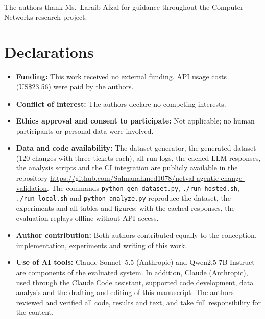 \documentclass[pdflatex,iicol,sn-mathphys-num]{sn-jnl}%
\theoremstyle{thmstyletwo}%
\begin{document}
\backmatter

The authors thank Ms.\ Laraib Afzal for guidance throughout the Computer Networks research project.

\section*{Declarations}

\begin{itemize}
\item \textbf{Funding:} This work received no external funding. API usage costs (US\$23.56) were paid by the authors.
\item \textbf{Conflict of interest:} The authors declare no competing interests.
\item \textbf{Ethics approval and consent to participate:} Not applicable; no human participants or personal data were involved.
\item \textbf{Data and code availability:} The dataset generator, the generated dataset (120 changes with three tickets each), all run logs, the cached LLM responses, the analysis scripts and the CI integration are publicly available in the repository \url{https://github.com/Salmanahmed1078/netval-agentic-change-validation}. The commands \texttt{python gen\_dataset.py}, \texttt{./run\_hosted.sh}, \texttt{./run\_local.sh} and \texttt{python analyze.py} reproduce the dataset, the experiments and all tables and figures; with the cached responses, the evaluation replays offline without API access.
\item \textbf{Author contribution:} Both authors contributed equally to the conception, implementation, experiments and writing of this work.
\item \textbf{Use of AI tools:} Claude Sonnet~5.5 (Anthropic) and Qwen2.5-7B-Instruct are components of the evaluated system. In addition, Claude (Anthropic), used through the Claude Code assistant, supported code development, data analysis and the drafting and editing of this manuscript. The authors reviewed and verified all code, results and text, and take full responsibility for the content.
\end{itemize}
\end{document}
